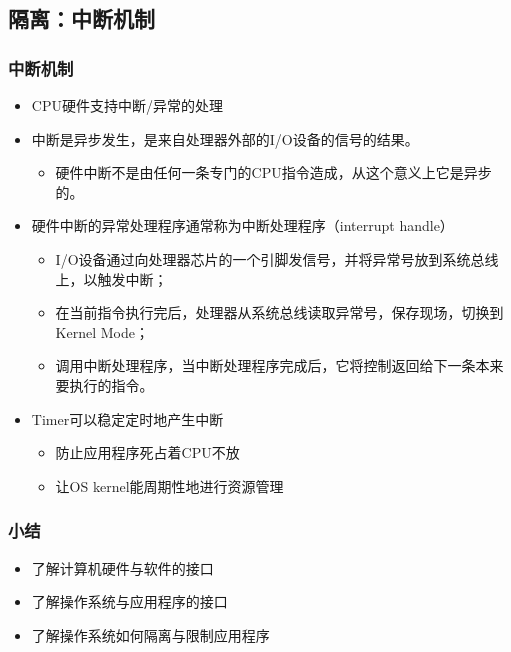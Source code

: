 \subsection{隔离：中断机制}
\begin{frame}
	\frametitle{中断机制}
	\begin{itemize}
		\item CPU硬件支持中断/异常的处理
		\item 中断是异步发生，是来自处理器外部的I/O设备的信号的结果。
		\begin{itemize}
			\item 硬件中断不是由任何一条专门的CPU指令造成，从这个意义上它是异步的。
			
		\end{itemize}
\pause
			\item 硬件中断的异常处理程序通常称为中断处理程序（interrupt handle）
			\begin{itemize}
				\item I/O设备通过向处理器芯片的一个引脚发信号，并将异常号放到系统总线上，以触发中断；
				\item 在当前指令执行完后，处理器从系统总线读取异常号，保存现场，切换到Kernel Mode；
				\item 调用中断处理程序，当中断处理程序完成后，它将控制返回给下一条本来要执行的指令。
			\end{itemize}			
\pause
			\item Timer可以稳定定时地产生中断
			\begin{itemize}
				\item 防止应用程序死占着CPU不放
				\item 让OS kernel能周期性地进行资源管理
			\end{itemize}				
	\end{itemize}
\end{frame}


\begin{frame}
    \frametitle{小结}
    \begin{itemize}
        \item 了解计算机硬件与软件的接口
        \item 了解操作系统与应用程序的接口
        \item 了解操作系统如何隔离与限制应用程序
    \end{itemize}
\end{frame}


